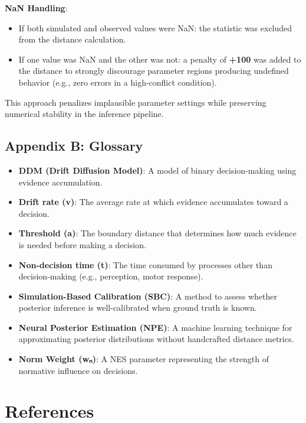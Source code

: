 \documentclass[
  11pt,
]{article}
\providecommand{\tightlist}{%
  \setlength{\itemsep}{0pt}\setlength{\parskip}{0pt}}
\begin{document}
\textbf{NaN Handling}:

\begin{itemize}
\tightlist
\item
  If both simulated and observed values were NaN: the statistic was
  excluded from the distance calculation.
\item
  If one value was NaN and the other was not: a penalty of \textbf{+100}
  was added to the distance to strongly discourage parameter regions
  producing undefined behavior (e.g., zero errors in a high-conflict
  condition).
\end{itemize}

This approach penalizes implausible parameter settings while preserving
numerical stability in the inference pipeline.

\subsection{Appendix B: Glossary}\label{appendix-b-glossary}

\begin{itemize}
\item
  \textbf{DDM (Drift Diffusion Model)}: A model of binary
  decision-making using evidence accumulation.
\item
  \textbf{Drift rate (v)}: The average rate at which evidence
  accumulates toward a decision.
\item
  \textbf{Threshold (a)}: The boundary distance that determines how much
  evidence is needed before making a decision.
\item
  \textbf{Non-decision time (t)}: The time consumed by processes other
  than decision-making (e.g., perception, motor response).
\item
  \textbf{Simulation-Based Calibration (SBC)}: A method to assess
  whether posterior inference is well-calibrated when ground truth is
  known.
\item
  \textbf{Neural Posterior Estimation (NPE)}: A machine learning
  technique for approximating posterior distributions without
  handcrafted distance metrics.
\item
  \textbf{Norm Weight (wₙ)}: A NES parameter representing the strength
  of normative influence on decisions.
\end{itemize}

\section*{References}\label{bibliography}
\end{document}
